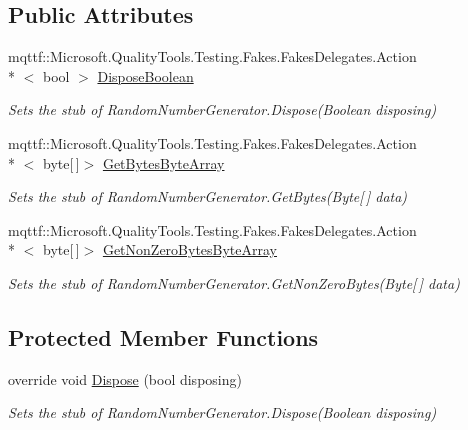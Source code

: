 \subsection*{Public Attributes}
\begin{DoxyCompactItemize}
\item 
mqttf\-::\-Microsoft.\-Quality\-Tools.\-Testing.\-Fakes.\-Fakes\-Delegates.\-Action\\*
$<$ bool $>$ \hyperlink{class_system_1_1_security_1_1_cryptography_1_1_fakes_1_1_stub_random_number_generator_abc95625bc1a4c77f8aaf338be82122cf}{Dispose\-Boolean}
\begin{DoxyCompactList}\small\item\em Sets the stub of Random\-Number\-Generator.\-Dispose(\-Boolean disposing)\end{DoxyCompactList}\item 
mqttf\-::\-Microsoft.\-Quality\-Tools.\-Testing.\-Fakes.\-Fakes\-Delegates.\-Action\\*
$<$ byte\mbox{[}$\,$\mbox{]}$>$ \hyperlink{class_system_1_1_security_1_1_cryptography_1_1_fakes_1_1_stub_random_number_generator_a70c6c0108ebe980dd1b5dda4bf65fc03}{Get\-Bytes\-Byte\-Array}
\begin{DoxyCompactList}\small\item\em Sets the stub of Random\-Number\-Generator.\-Get\-Bytes(\-Byte\mbox{[}$\,$\mbox{]} data)\end{DoxyCompactList}\item 
mqttf\-::\-Microsoft.\-Quality\-Tools.\-Testing.\-Fakes.\-Fakes\-Delegates.\-Action\\*
$<$ byte\mbox{[}$\,$\mbox{]}$>$ \hyperlink{class_system_1_1_security_1_1_cryptography_1_1_fakes_1_1_stub_random_number_generator_a61579c1645e41043b325888fea929864}{Get\-Non\-Zero\-Bytes\-Byte\-Array}
\begin{DoxyCompactList}\small\item\em Sets the stub of Random\-Number\-Generator.\-Get\-Non\-Zero\-Bytes(\-Byte\mbox{[}$\,$\mbox{]} data)\end{DoxyCompactList}\end{DoxyCompactItemize}
\subsection*{Protected Member Functions}
\begin{DoxyCompactItemize}
\item 
override void \hyperlink{class_system_1_1_security_1_1_cryptography_1_1_fakes_1_1_stub_random_number_generator_ad7662a771ceab0873ca6e4193a22c25f}{Dispose} (bool disposing)
\begin{DoxyCompactList}\small\item\em Sets the stub of Random\-Number\-Generator.\-Dispose(\-Boolean disposing)\end{DoxyCompactList}\end{DoxyCompactItemize}
